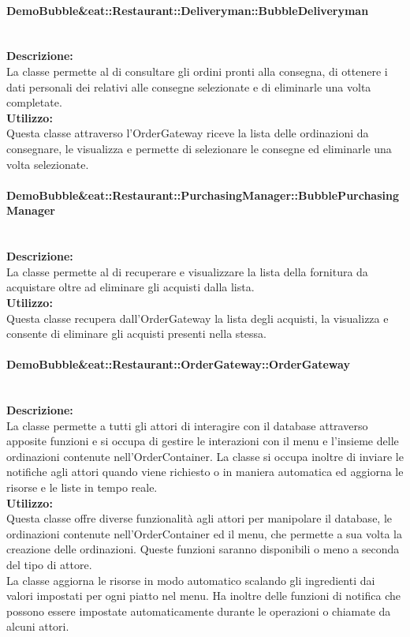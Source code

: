 \paragraph{Demo\-Bubble\&eat\-::Restaurant\-::Deliveryman\-::Bubble\-Deliveryman}\label{eat-deliveryman}\mbox{}\\
\textbf{Descrizione:}\\
La classe permette al \Deliveryman{} di consultare gli ordini pronti alla consegna, di ottenere i dati personali dei \Customer[2]{} relativi alle consegne selezionate e di eliminarle una volta completate.\\
\textbf{Utilizzo:}\\
Questa classe attraverso l'Order\-Gateway riceve la lista delle ordinazioni da consegnare, le visualizza e permette di selezionare le consegne ed eliminarle una volta selezionate.

\paragraph{Demo\-Bubble\&eat\-::Restaurant\-::PurchasingManager\-::Bubble\-Purcha\-sing\-Ma\-nager}\label{eat-purchasing}\mbox{}\\
\textbf{Descrizione:}\\
La classe permette al \Purchasingmanager{} di recuperare e visualizzare la lista della fornitura da acquistare oltre ad eliminare gli acquisti dalla lista.\\
\textbf{Utilizzo:}\\
Questa classe recupera dall'Order\-Gateway la lista degli acquisti, la visualizza e consente di eliminare gli acquisti presenti nella stessa.

\paragraph{Demo\-Bubble\&eat\-::Restaurant\-::Order\-Gateway\-::Order\-Gateway}\label{eat-gateway}\mbox{}\\
\textbf{Descrizione:}\\
La classe permette a tutti gli attori di interagire con il database attraverso apposite funzioni e si occupa di gestire le interazioni con il menu e l'insieme delle ordinazioni contenute nell'OrderContainer. La classe si occupa inoltre di inviare le notifiche agli attori quando viene richiesto o in maniera automatica ed aggiorna le risorse e le liste in tempo reale.\\
\textbf{Utilizzo:}\\
Questa classe offre diverse funzionalità agli attori per manipolare il database, le ordinazioni contenute nell'OrderContainer ed il menu, che permette a sua volta la creazione delle ordinazioni. Queste funzioni saranno disponibili o meno a seconda del tipo di attore.\\
La classe aggiorna le risorse in modo automatico scalando gli ingredienti dai valori impostati per ogni piatto nel menu. Ha inoltre delle funzioni di notifica che possono essere impostate automaticamente durante le operazioni o chiamate da alcuni attori.

